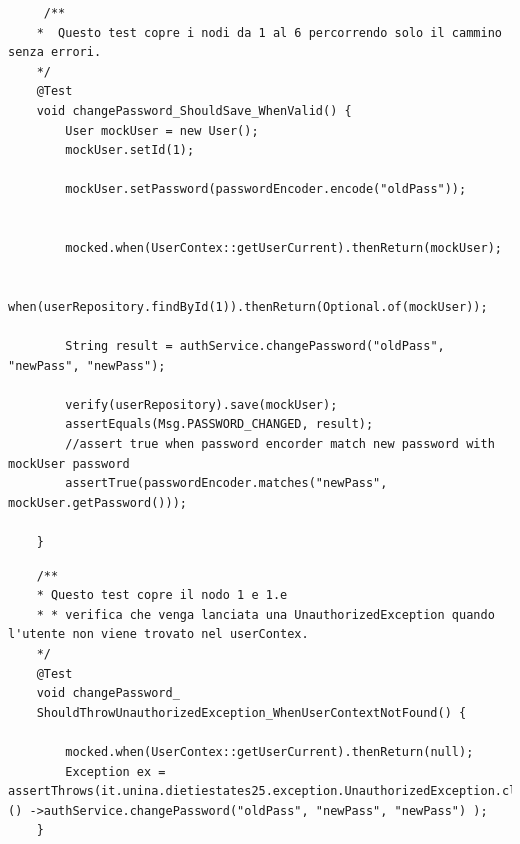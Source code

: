 

\begin{lstlisting}
	 /**
	*  Questo test copre i nodi da 1 al 6 percorrendo solo il cammino senza errori.
	*/
	@Test
	void changePassword_ShouldSave_WhenValid() {
		User mockUser = new User();
		mockUser.setId(1);
		
		mockUser.setPassword(passwordEncoder.encode("oldPass"));
		
		
		mocked.when(UserContex::getUserCurrent).thenReturn(mockUser);
		
		when(userRepository.findById(1)).thenReturn(Optional.of(mockUser));
		
		String result = authService.changePassword("oldPass", "newPass", "newPass");
		
		verify(userRepository).save(mockUser);
		assertEquals(Msg.PASSWORD_CHANGED, result);
		//assert true when password encorder match new password with mockUser password
		assertTrue(passwordEncoder.matches("newPass", mockUser.getPassword()));
		
	}
\end{lstlisting}

\begin{lstlisting}
	/**
	* Questo test copre il nodo 1 e 1.e
	* * verifica che venga lanciata una UnauthorizedException quando l'utente non viene trovato nel userContex.
	*/
	@Test
	void changePassword_
	ShouldThrowUnauthorizedException_WhenUserContextNotFound() {
		
		mocked.when(UserContex::getUserCurrent).thenReturn(null);
		Exception ex = assertThrows(it.unina.dietiestates25.exception.UnauthorizedException.class, () ->authService.changePassword("oldPass", "newPass", "newPass") );
	}
\end{lstlisting}
	
